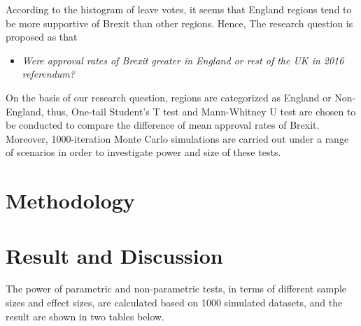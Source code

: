 \documentclass[]{article}
\providecommand{\tightlist}{%
  \setlength{\itemsep}{0pt}\setlength{\parskip}{0pt}}
\begin{document}
According to the histogram of leave votes, it seems that England regions
tend to be more supportive of Brexit than other regions. Hence, The
research question is proposed as that

\begin{itemize}
\tightlist
\item
  \emph{Were approval rates of Brexit greater in England or rest of the
  UK in 2016 referendum?}
\end{itemize}

On the basis of our research question, regions are categorized as
England or Non-England, thus, One-tail Student's T test and Mann-Whitney
U test are chosen to be conducted to compare the difference of mean
approval rates of Brexit. Moreover, 1000-iteration Monte Carlo
simulations are carried out under a range of scenarios in order to
investigate power and size of these tests.

\hypertarget{methodology}{%
\section{Methodology}\label{methodology}}

\hypertarget{result-and-discussion}{%
\section{Result and Discussion}\label{result-and-discussion}}

The power of parametric and non-parametric tests, in terms of different
sample sizes and effect sizes, are calculated based on 1000 simulated
datasets, and the result are shown in two tables below.
\end{document}
